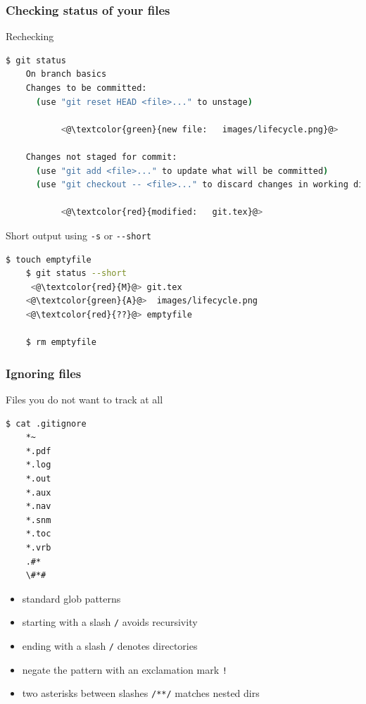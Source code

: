 \documentclass{beamer}
\begin{document}
\begin{frame}[fragile]
  \frametitle{Checking status of your files}
  Rechecking
  \begin{lstlisting}[language=bash,basicstyle=\ttfamily\tiny]
    $ git status
    On branch basics
    Changes to be committed:
      (use "git reset HEAD <file>..." to unstage)

           <@\textcolor{green}{new file:   images/lifecycle.png}@>

    Changes not staged for commit:
      (use "git add <file>..." to update what will be committed)
      (use "git checkout -- <file>..." to discard changes in working directory)

           <@\textcolor{red}{modified:   git.tex}@>

  \end{lstlisting}

  Short output using \lstinline{-s} or \lstinline{--short}
  \begin{lstlisting}[language=bash,basicstyle=\ttfamily\tiny]
    $ touch emptyfile
    $ git status --short
     <@\textcolor{red}{M}@> git.tex
    <@\textcolor{green}{A}@>  images/lifecycle.png
    <@\textcolor{red}{??}@> emptyfile

    $ rm emptyfile
  \end{lstlisting}
\end{frame}

\begin{frame}[fragile]
  \frametitle{Ignoring files}
  Files you do not want to track at all
  \begin{lstlisting}[language=bash,basicstyle=\ttfamily\tiny]
    $ cat .gitignore
    *~
    *.pdf
    *.log
    *.out
    *.aux
    *.nav
    *.snm
    *.toc
    *.vrb
    .#*
    \#*#
  \end{lstlisting}

  \begin{itemize}
    \item standard glob patterns
    \item starting with a slash \lstinline{/} avoids recursivity
    \item ending with a slash \lstinline{/} denotes directories
    \item negate the pattern with an exclamation mark \lstinline{!}
    \item two asterisks between slashes \lstinline{/**/} matches nested dirs
  \end{itemize}
\end{frame}
\end{document}
